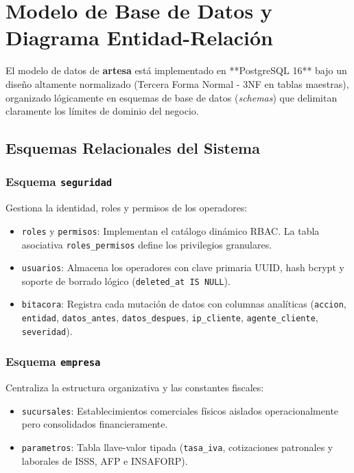 \section{Modelo de Base de Datos y Diagrama Entidad-Relación}
\label{sec:modelo_bd}

El modelo de datos de \textbf{artesa} está implementado en **PostgreSQL 16** bajo un diseño altamente normalizado (Tercera Forma Normal - 3NF en tablas maestras), organizado lógicamente en esquemas de base de datos (\textit{schemas}) que delimitan claramente los límites de dominio del negocio.

\subsection{Esquemas Relacionales del Sistema}

\subsubsection{Esquema \texttt{seguridad}}
Gestiona la identidad, roles y permisos de los operadores:
\begin{itemize}
    \item \texttt{roles} y \texttt{permisos}: Implementan el catálogo dinámico RBAC. La tabla asociativa \texttt{roles\_permisos} define los privilegios granulares.
    \item \texttt{usuarios}: Almacena los operadores con clave primaria UUID, hash bcrypt y soporte de borrado lógico (\texttt{deleted\_at IS NULL}).
    \item \texttt{bitacora}: Registra cada mutación de datos con columnas analíticas (\texttt{accion}, \texttt{entidad}, \texttt{datos\_antes}, \texttt{datos\_despues}, \texttt{ip\_cliente}, \texttt{agente\_cliente}, \texttt{severidad}).
\end{itemize}

\subsubsection{Esquema \texttt{empresa}}
Centraliza la estructura organizativa y las constantes fiscales:
\begin{itemize}
    \item \texttt{sucursales}: Establecimientos comerciales físicos aislados operacionalmente pero consolidados financieramente.
    \item \texttt{parametros}: Tabla llave-valor tipada (\texttt{tasa\_iva}, cotizaciones patronales y laborales de ISSS, AFP e INSAFORP).
\end{itemize}

